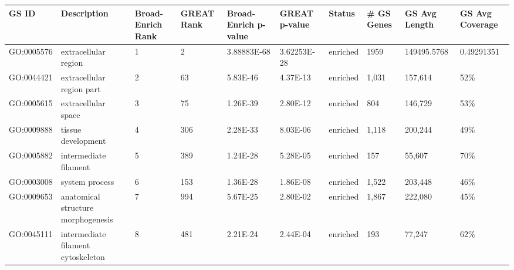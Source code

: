 \begin{sidewaystable}[!ht]
\tiny
\centering
\begin{tabular}{lp{2cm}p{1cm}p{1cm}p{1.25cm}p{1.25cm}p{1cm}p{1.25cm}p{1.25cm}p{1.25cm}}
\textbf{GS ID} & \textbf{Description}               & \textbf{Broad-Enrich Rank} & \textbf{GREAT Rank} & \textbf{Broad-Enrich p-value} & \textbf{GREAT p-value} & \textbf{Status} & \textbf{\# GS Genes} & \textbf{GS Avg Length} & \textbf{GS Avg Coverage} \\\hline
GO:0005576     & extracellular region               & 1                          & 2                   & 3.88883E-68                   & 3.62253E-28            & enriched        & 1959                 & 149495.5768            & 0.49291351               \\
GO:0044421     & extracellular region part          & 2                          & 63                  & 5.83E-46                      & 4.37E-13               & enriched        & 1,031                & 157,614                & 52\%                     \\
GO:0005615     & extracellular space                & 3                          & 75                  & 1.26E-39                      & 2.80E-12               & enriched        & 804                  & 146,729                & 53\%                     \\
GO:0009888     & tissue development                 & 4                          & 306                 & 2.28E-33                      & 8.03E-06               & enriched        & 1,118                & 200,244                & 49\%                     \\
GO:0005882     & intermediate filament              & 5                          & 389                 & 1.24E-28                      & 5.28E-05               & enriched        & 157                  & 55,607                 & 70\%                     \\
GO:0003008     & system process                     & 6                          & 153                 & 1.36E-28                      & 1.86E-08               & enriched        & 1,522                & 203,448                & 46\%                     \\
GO:0009653     & anatomical structure morphogenesis & 7                          & 994                 & 5.67E-25                      & 2.80E-02               & enriched        & 1,867                & 222,080                & 45\%                     \\
GO:0045111     & intermediate filament cytoskeleton & 8                          & 481                 & 2.21E-24                      & 2.44E-04               & enriched        & 193                  & 77,247                 & 62\%                     \\

\end{tabular}
\end{sidewaystable}
